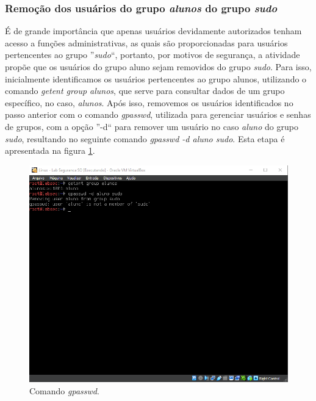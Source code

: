 \documentclass[
	12pt,				%
	oneside,   	        %
	a4paper,			%
	english,			%
	french,				%
	spanish,			%
	brazil,				%
	]{pacotes/abntex2}
\begin{document}
\subsubsection{Remoção dos usuários do grupo \textit{alunos} do grupo \textit{sudo}}
É de grande importância que apenas usuários devidamente autorizados tenham acesso a funções administrativas, as quais são proporcionadas para usuários pertencentes ao grupo ''\textit{sudo}``, portanto, por motivos de segurança, a atividade propõe que os usuários do grupo aluno sejam removidos do grupo \textit{sudo}. Para isso, inicialmente identificamos os usuários pertencentes ao grupo alunos, utilizando o comando \textit{getent group alunos}, que serve para consultar dados de um grupo específico, no caso, \textit{alunos}. Após isso, removemos os usuários identificados no passo anterior com o comando \textit{gpasswd}, utilizada para gerenciar usuários e senhas de grupos, com a opção ''-d`` para remover um usuário no caso \textit{aluno} do grupo \textit{sudo}, resultando no seguinte comando \textit{gpasswd -d aluno sudo}. Esta etapa é apresentada na figura \ref{fig:gpasswd}.

\begin{figure}[H]
  \centering
  \includegraphics[scale=0.7]{figuras/gpasswd.png}
  \caption{Comando \textit{gpasswd}.}
  \label{fig:gpasswd}
\end{figure}
\end{document}
